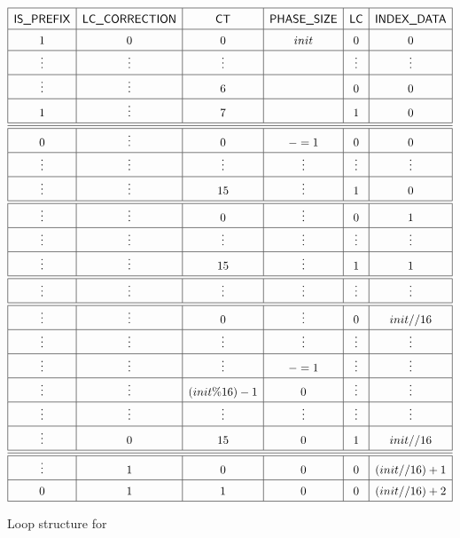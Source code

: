 \begin{figure}
\[
    \renewcommand{\arraystretch}{1.5}
    \begin{array}{|c|c|c|c|c|c|} \hline
        \isprefix & \ispadding & \ct             & \phasesize & \lc    & \indexData     \\ \hline
        1         & 0          & 0               & init       & 0      & 0              \\ \hline
        \vdots    & \vdots     & \vdots          &            & \vdots & \vdots         \\ \hline
        \vdots    & \vdots     & 6               &            & 0      & 0              \\ \hline
        1         & \vdots     & 7               &            & 1      & 0              \\ \hline \hline \hline
        0         & \vdots     & 0               & -=1        & 0      & 0              \\ \hline
        \vdots    & \vdots     & \vdots          & \vdots     & \vdots & \vdots         \\ \hline
        \vdots    & \vdots     & 15              & \vdots     & 1      & 0              \\ \hline \hline
        \vdots    & \vdots     & 0               & \vdots     & 0      & 1              \\ \hline
        \vdots    & \vdots     & \vdots          & \vdots     & \vdots & \vdots         \\ \hline
        \vdots    & \vdots     & 15              & \vdots     & 1      & 1              \\ \hline \hline
        \vdots    & \vdots     & \vdots          & \vdots     & \vdots & \vdots         \\ \hline \hline
        \vdots    & \vdots     & 0               & \vdots     & 0      & init // 16     \\ \hline
        \vdots    & \vdots     & \vdots          & \vdots     & \vdots & \vdots         \\ \hline
        \vdots    & \vdots     & \vdots          & -=1        & \vdots & \vdots         \\ \hline
        \vdots    & \vdots     & (init \% 16) -1 & 0          & \vdots & \vdots         \\ \hline
        \vdots    & \vdots     & \vdots          & \vdots     & \vdots & \vdots         \\ \hline
        \vdots    & 0          & 15              & 0          & 1      & init // 16     \\ \hline \hline \hline
        \vdots    & 1          & 0               & 0          & 0      & (init // 16)+1 \\ \hline
        0         & 1          & 1               & 0          & 0      & (init // 16)+2 \\ \hline
    \end{array}
\]
\caption{Loop structure for }
\label{Phase 9 loop}
\end{figure}
